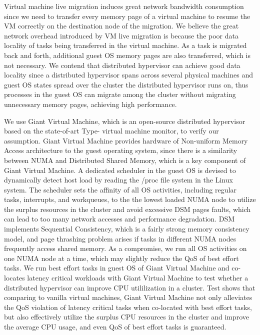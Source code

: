 \begin{bigabstract}
Virtual machine live migration induces great network bandwidth consumption since we need to transfer every memory page of a virtual machine to resume the VM correctly on the destination node of the migration. We believe the great network overhead introduced by VM live migration is because the poor data locality of tasks being transferred in the virtual machine. As a task is migrated back and forth, additional guest OS memory pages are also transferred, which is not necessary. We contend that distributed hypervisor can achieve good data locality since a distributed hypervisor spans across several physical machines and guest OS states spread over the cluster the distributed hypervisor runs on, thus processes in the guest OS can migrate among the cluster without migrating unnecessary memory pages, achieving high performance. 

We use Giant Virtual Machine, which is an open-source distributed hypervisor based on the state-of-art Type-\uppercase\expandafter{} virtual machine monitor, to verify our assumption. Giant Virtual Machine provides hardware of Non-uniform Memory Access architecture to the guest operating system, since there is a similarity between NUMA and Distributed Shared Memory, which is a key component of Giant Virtual Machine. A dedicated scheduler in the guest OS is devised to dynamically detect host load by reading the /proc file system in the Linux system. The scheduler sets the affinity of all OS activities, including regular tasks, interrupts, and workqueues, to the the lowest loaded NUMA node to utilize the surplus resources in the cluster and avoid excessive DSM pages faults, which can lead to too many network accesses and performance degradation. DSM implements Sequential Consistency, which is a fairly strong memory consistency model, and page thrashing problem arises if tasks in different NUMA nodes frequently access shared memory. As a compromise, we run all OS activities on one NUMA node at a time, which may slightly reduce the QoS of best effort tasks. We run best effort tasks in guest OS of Giant Virtual Machine and co-locates latency critical workloads with Giant Virtual Machine to test whether a distributed hypervisor can improve CPU utililization in a cluster. Test shows that comparing to vanilla virtual machines, Giant Virtual Machine not only alleviates the QoS violation of latency critical tasks when co-located with best effort tasks, but also effectively utilize the surplus CPU resources in the cluster and improve the average CPU usage, and even QoS of best effort tasks is guaranteed.


\end{bigabstract}
